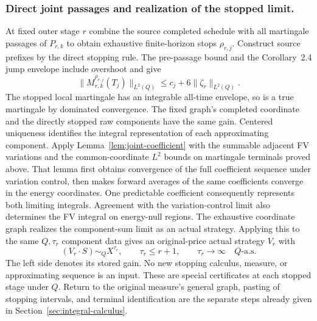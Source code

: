 \subsubsection{Direct joint passages and realization of the stopped limit.}\label{sec:joint-realization}
At fixed outer stage $r$ combine the source completed schedule with all
martingale passages of $P_{r,k}$ to obtain exhaustive finite-horizon stops
$\rho_{r,j}$. Construct source prefixes by the direct stopping rule.
The pre-passage bound and the Corollary~2.4 jump envelope include overshoot
and give
\[
 \|M_{r,k}^{\rho_{r,j}}(T_j)\|_{L^2(Q)}
 \leq c_j+6\|\zeta_r\|_{L^2(Q)}.
\]
The stopped local martingale has an integrable all-time envelope, so is a
true martingale by dominated convergence.
The fixed graph's completed coordinate and the directly stopped raw
components have the same gain. Centered uniqueness identifies the integral
representation of each approximating component. Apply
Lemma~\ref{lem:joint-coefficient} with the summable adjacent FV variations
and the common-coordinate $L^2$ bounds on martingale terminals proved above.
That lemma first obtains convergence of the full coefficient sequence under
variation control, then makes forward averages of the same coefficients
converge in the energy coordinates. One predictable coefficient consequently
represents both limiting integrals. Agreement with the variation-control
limit also determines the FV integral on energy-null regions.
The exhaustive coordinate graph realizes the component-sum limit as an
actual strategy. Applying this to the same $Q,\tau_r$ component data gives
an original-price actual strategy $V_r$ with
\[
 (V_r\cdot S)\sim_Q X^{\tau_r},\qquad
 \tau_r\leq r+1,\qquad\tau_r\to\infty\quad Q\text{-a.s.}
\]
The left side denotes its stored gain. No new stopping calculus, measure,
or approximating sequence is an input. These are special certificates at
each stopped stage under $Q$. Return to the original measure's general graph,
pasting of stopping intervals, and terminal identification are the separate
steps already given in Section~\ref{sec:integral-calculus}.
